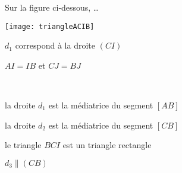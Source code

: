 \begin{QCM}
\begin{GroupeQCM}
    \begin{exercice}
      Sur la figure ci‑dessous, \ldots
      
     \begin{minipage}[c]{0.32\textwidth}
     \quad \texttt{[image: triangleACIB]}
     \end{minipage} \hfill%
     \begin{minipage}[c]{0.66\textwidth}
     $d_1$ correspond à la droite $(CI)$
     
     $AI = IB$ et $CJ = BJ$
     \end{minipage} \\
      
      \begin{ChoixQCM}{4}
      \item la droite $d_1$ est la médiatrice du segment $[AB]$
      \item la droite $d_2$ est la médiatrice du segment $[CB]$
      \item le triangle $BCI$ est un triangle rectangle
      \item $d_3 \parallel (CB)$
      \end{ChoixQCM}
\begin{corrige}
   \end{corrige}
    \end{exercice}
    

\end{GroupeQCM}
\end{QCM}

  